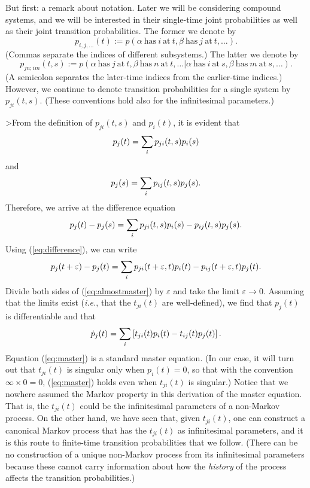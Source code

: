 \documentclass[12pt]{article}
\newcommand{\be}{\vspace*{6pt} \begin{equation}}
\newcommand{\ee}{\vspace*{10pt} \end{equation}}
\newcommand{\ie}{{\it i.e.}}         %
\newcommand{\ga}{\alpha}                                        %
\newcommand{\gb}{\beta}                                         %
\renewcommand{\epsilon}{\varepsilon}
\begin{document}
But first:  a remark about notation. Later we will be considering
compound systems, and we will be interested in their single-time joint
probabilities as well as their joint transition probabilities.  The
former we denote by
\[
p_{i,j,\ldots}(t) := p(\ga \ \mbox{has} \ i \
\mbox{at} \ t, \gb \ \mbox{has} \ j \ \mbox{at}\ t, \ldots ).
\]
(Commas separate the indices of different subsystems.)  The latter we
denote by
\[
p_{jn;im}(t,s) := p(\ga \ \mbox{has} \ j \
\mbox{at} \ t, \gb \ \mbox{has} \ n \ \mbox{at}\ t, \ldots \vert
\ga \ \mbox{has} \ i \ \mbox{at} \ s, \gb \ \mbox{has} \ m \ \mbox{at}\
s, \ldots).
\]
(A semicolon separates the later-time indices from the earlier-time
indices.)  However, we continue to denote transition probabilities
for a single system by $p_{ji}(t,s)$.  (These conventions hold also
for the infinitesimal parameters.)

>From the definition of $p_{ji}(t,s)$ and $p_{i}(t)$, it is evident
that
\be
p_{j}(t) = \sum_{i} p_{ji}(t,s) p_{i}(s)
\ee
and
\be
p_{j}(s) = \sum_{i} p_{ij}(t,s) p_{j}(s).
\ee
Therefore, we arrive at the difference equation
\be
\label{eq:difference}
p_{j}(t) - p_{j}(s) = \sum_{i}p_{ji}(t,s) p_{i}(s) - p_{ij}(t,s)
p_{j}(s).
\ee
Using (\ref{eq:difference}), we can write
\be
\label{eq:almostmaster}
p_{j}(t+\epsilon) - p_{j}(t) = \sum_{i}p_{ji}(t+\epsilon,t)
p_{i}(t) - p_{ij}(t+\epsilon,t) p_{j}(t).
\ee
Divide both sides of (\ref{eq:almostmaster}) by $\epsilon$ and take
the limit $\epsilon \rightarrow 0$.  Assuming that the limits exist
(\ie, that the $t_{ji}(t)$ are well-defined), we find that $p_{j}(t)$
is differentiable and that
\be
\label{eq:master}
\dot{p}_{j}(t) = \sum_{i} \left[ { t_{ji}(t) p_{i}(t) - t_{ij}(t)
p_{j}(t) } \right].
\ee
Equation (\ref{eq:master}) is a standard master equation.  (In our
case, it will turn out that $t_{ji}(t)$ is singular only when
$p_{i}(t) = 0$, so that with the convention $\infty \times 0 = 0$,
(\ref{eq:master}) holds even when $t_{ji}(t)$ is singular.) Notice
that we nowhere assumed the Markov property in this derivation of the
master equation.  That is, the $t_{ji}(t)$ could be the infinitesimal
parameters of a non-Markov process.  On the other hand, we have seen
that, given $t_{ji}(t)$, one can construct a canonical Markov process
that has the $t_{ji}(t)$ as infinitesimal parameters, and it is this
route to finite-time transition probabilities that we follow.  (There
can be no construction of a unique non-Markov process from its
infinitesimal parameters because these cannot carry information about
how the {\it history} of the process affects the transition
probabilities.)
\end{document}
